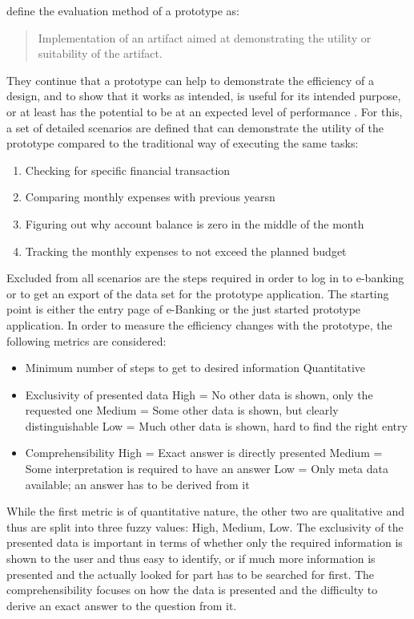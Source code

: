 \newcommand{\scenone}{Checking for specific financial transaction}
\newcommand{\scentwo}{Comparing monthly expenses with previous yearsn}
\newcommand{\scenthree}{Figuring out why  account balance is zero in the middle of the month}
\newcommand{\scenfour}{Tracking the monthly expenses to not exceed the planned budget}

\citet[p.4]{Peffers2012} define the evaluation method of a prototype as: \blockquote{Implementation of an artifact aimed at demonstrating the utility or suitability of the artifact.} They continue that a prototype can help to demonstrate the efficiency of a design, and to show that it works as intended, is useful for its intended purpose, or at least has the potential to be at an expected level of performance \citep{Peffers2012}. For this, a set of detailed scenarios are defined that can demonstrate the utility of the prototype compared to the traditional way of executing the same tasks:
\begin{enumerate}
	\item \scenone
	\item \scentwo
	\item \scenthree
	\item \scenfour
\end{enumerate}
Excluded from all scenarios are the steps required in order to log in to e-banking or to get an export of the data set for the prototype application. The starting point is either the entry page of e-Banking or the just started prototype application. In order to measure the efficiency changes with the prototype, the following metrics are considered:
\begin{itemize}[noitemsep,nolistsep]
	\item Minimum number of steps to get to desired information
		\subitem Quantitative
	\item Exclusivity of presented data
		\subitem High = No other data is shown, only the requested one
		\subitem Medium = Some other data is shown, but clearly distinguishable
		\subitem Low = Much other data is shown, hard to find the right entry
	\item Comprehensibility
		\subitem High = Exact answer is directly presented
		\subitem Medium = Some interpretation is required to have an answer
		\subitem Low = Only meta data available; an answer has to be derived from it
\end{itemize}
While the first metric is of quantitative nature, the other two are qualitative and thus are split into three fuzzy values: High, Medium, Low. The exclusivity of the presented data is important in terms of whether only the required information is shown to the user and thus easy to identify, or if much more information is presented and the actually looked for part has to be searched for first. The comprehensibility focuses on how the data is presented and the difficulty to derive an exact answer to the question from it. \newline
